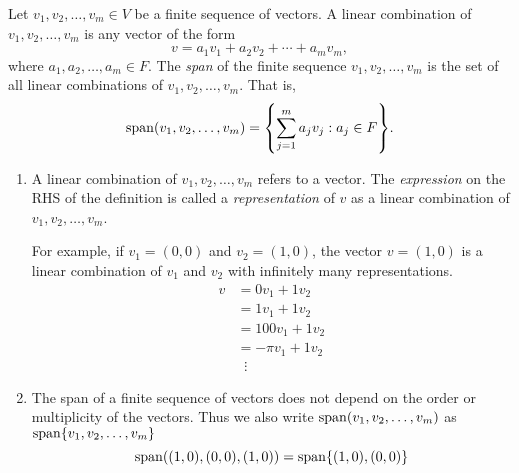 \begin{defn} \label{defn:vector:span:finite_sequence}
    Let $v_{1}, v_{2}, \dots, v_{m} \in V$ be a finite sequence of vectors.
    A linear combination of $v_{1}, v_{2}, \dots, v_{m}$ is any vector of the form \[
        v = a_{1} v_{1} + a_{2} v_{2} + \cdots + a_{m} v_{m},
    \] where $a_{1}, a_{2}, \dots, a_{m} \in F$.
    The \emph{span} of the finite sequence $v_{1}, v_{2}, \dots, v_{m}$ is the set of all linear combinations of $v_{1}, v_{2}, \dots, v_{m}$.
    That is, \[
        \spann(v_{1}, v_{2}, \dots, v_{m}) = \set{\sum_{j = 1}^{m} a_{j} v_{j} : a_{j} \in F}.
    \]
\end{defn}
\begin{rem}
    \begin{enumerate}[label=(\alph*)]
        \item A linear combination of $v_{1}, v_{2}, \dots, v_{m}$ refers to a vector.
        The \emph{expression} on the RHS of the definition is called a \emph{representation} of $v$ as a linear combination of $v_{1}, v_{2}, \dots, v_{m}$.

        For example, if $v_{1} = (0, 0)$ and $v_{2} = (1, 0)$, the vector $v = (1, 0)$ is a linear combination of $v_{1}$ and $v_{2}$ with infinitely many representations.
        \begin{align*}
            v &= 0 v_{1} + 1 v_{2} \\
            &= 1 v_{1} + 1 v_{2} \\
            &= 100 v_{1} + 1 v_{2} \\
            &= -\pi v_{1} + 1 v_{2} \\
            &\;\;\vdots
        \end{align*}

        \item The span of a finite sequence of vectors does not depend on the order or multiplicity of the vectors.
        Thus we also write $\operatorname{span}(v_{1}, v_{2}, \dots, v_{m})$ as $\spann\set{v_{1}, v_{2}, \dots, v_{m}}$ \[
            \spann((1, 0), (0, 0), (1, 0)) = \spann\set{(1, 0), (0, 0)}
        \]
    \end{enumerate}
\end{rem}
